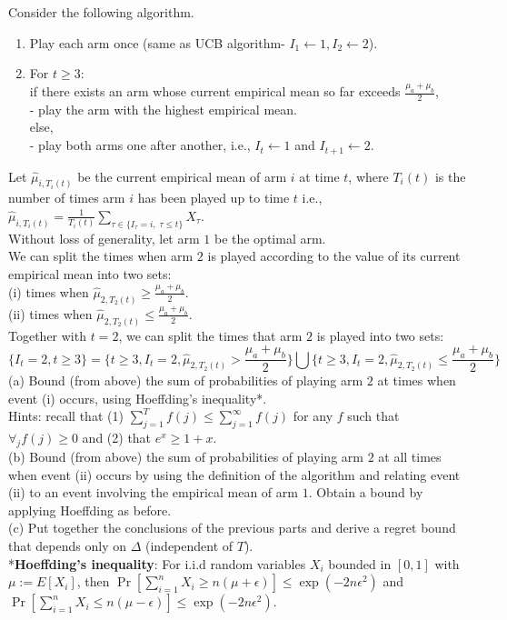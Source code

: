 \documentclass[11pt]{article}
\begin{document}
Consider the following algorithm. 
\begin{enumerate}
\item Play each arm once (same as UCB algorithm- $I_1\leftarrow 1, I_2\leftarrow 2$).
\item For $t\geq 3$:\\
if there exists an arm whose current empirical mean so far exceeds $\frac{\mu_a + \mu_b}{2}$,\\
- play the arm with the highest empirical mean.\\
else,\\
- play both arms one after another, i.e., $I_t\leftarrow 1$ and $I_{t+1}\leftarrow 2$.
\end{enumerate}

Let $\hat{\mu}_{i,T_i(t)}$ be the current empirical mean of arm $i$ at time $t$, where $T_i(t)$ is the number of times arm $i$ has been played up to time $t$ i.e., $\hat{\mu}_{i,T_i(t)}=\frac{1}{T_i(t)}\sum_{\tau\in \{I_\tau=i,\;\tau\leq t\}} X_{\tau}$.\\
Without loss of generality, let arm $1$ be the optimal arm.\\
We can split the times when arm $2$ is played according to the value of its current empirical mean into two sets:\\
(i) times when $\hat{\mu}_{2,T_2(t)}\geq\frac{\mu_a + \mu_b}{2}$.\\
(ii) times when  $\hat{\mu}_{2,T_2(t)}\leq \frac{\mu_a + \mu_b}{2}$.\\
Together with $t=2$, we can split the times that arm $2$ is played into two sets:
\[
\{I_{t}=2,t\geq3\}=\{t\geq3, I_t=2,\hat{\mu}_{2,T_2(t)}>\frac{\mu_a + \mu_b}{2}\}\bigcup
\{t\geq3, I_t=2,\hat{\mu}_{2,T_2(t)}\leq\frac{\mu_a + \mu_b}{2}\}
\]
(a) Bound (from above) the sum of probabilities of playing arm $2$ at times when event (i) occurs, using Hoeffding’s inequality*.\\
Hints: recall that (1) $\sum_{j=1}^T f(j)\leq \sum_{j=1}^\infty f(j)$ for any $f$ such that $\forall_j f(j)\geq 0 $ and (2) that $e^x\geq 1+x$.\\
(b) Bound (from above) the sum of probabilities of playing arm $2$ at all times when event (ii) occurs by using the definition of the algorithm and relating event (ii) to an event involving the empirical mean of arm $1$. Obtain a bound by applying Hoeffding as before.\\
(c) Put together the conclusions of the previous parts and derive a regret bound that depends only on $\Delta$ (independent of $T$).\\
*\textbf{Hoeffding’s inequality}: For i.i.d random variables $X_i$ bounded in $[0, 1]$ with $\mu := E[X_i]$,
then $\Pr[\sum_{i=1}^nX_i\geq n(\mu+\epsilon)]\leq\exp{(-2n\epsilon^2)}$ and $\Pr[\sum_{i=1}^nX_i\leq n(\mu-\epsilon)]\leq\exp{(-2n\epsilon^2)}$.
\end{document}

